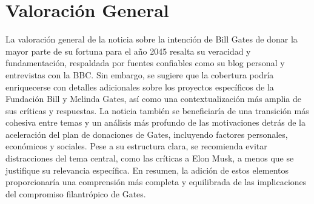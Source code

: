 \documentclass[10pt,a4paper]{article}
\begin{document}
\section*{Valoración General}
    La valoraci\'{o}n general de la noticia sobre la intenci\'{o}n de Bill Gates de donar la mayor parte de su fortuna para el a\~{n}o 2045 resalta su veracidad y fundamentaci\'{o}n, respaldada por fuentes confiables como su blog personal y entrevistas con la BBC. Sin embargo, se sugiere que la cobertura podr\'{i}a enriquecerse con detalles adicionales sobre los proyectos espec\'{i}ficos de la Fundaci\'{o}n Bill y Melinda Gates, as\'{i} como una contextualizaci\'{o}n m\'{a}s amplia de sus cr\'{i}ticas y respuestas. La noticia tambi\'{e}n se beneficiar\'{i}a de una transici\'{o}n m\'{a}s cohesiva entre temas y un an\'{a}lisis m\'{a}s profundo de las motivaciones detr\'{a}s de la aceleraci\'{o}n del plan de donaciones de Gates, incluyendo factores personales, econ\'{o}micos y sociales. Pese a su estructura clara, se recomienda evitar distracciones del tema central, como las cr\'{i}ticas a Elon Musk, a menos que se justifique su relevancia espec\'{i}fica. En resumen, la adici\'{o}n de estos elementos proporcionar\'{i}a una comprensi\'{o}n m\'{a}s completa y equilibrada de las implicaciones del compromiso filantr\'{o}pico de Gates.
\vspace{1em}

\end{document}
